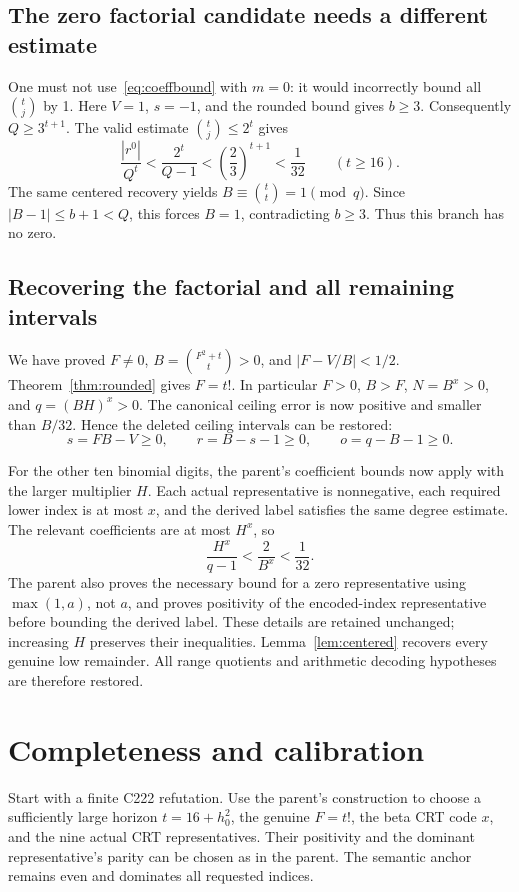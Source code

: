 \documentclass[11pt,letterpaper]{article}
\theoremstyle{remark}\newtheorem{remark}[theorem]{Remark}
\begin{document}
\subsection{The zero factorial candidate needs a different estimate}

One must not use~\eqref{eq:coeffbound} with \(m=0\): it would incorrectly
bound all \(\binom tj\) by 1. Here \(V=1\), \(s=-1\), and the rounded
bound gives \(b\ge3\). Consequently \(Q\ge3^{t+1}\). The valid estimate
\(\binom tj\le2^t\) gives
\[
 \frac{|r^0|}{Q^t}<\frac{2^t}{Q-1}
 <\left(\frac23\right)^{t+1}<\frac1{32}
 \qquad(t\ge16).
\]
The same centered recovery yields \(B\equiv\binom tt=1\pmod q\).
Since \(|B-1|\le b+1<Q\), this forces \(B=1\), contradicting \(b\ge3\).
Thus this branch has no zero.

\subsection{Recovering the factorial and all remaining intervals}

We have proved \(F\ne0\), \(B=\binom{F^2+t}{t}>0\), and
\(|F-V/B|<1/2\). Theorem~\ref{thm:rounded} gives \(F=t!\). In particular
\(F>0\), \(B>F\), \(N=B^x>0\), and \(q=(BH)^x>0\).
The canonical ceiling error is now positive and smaller than \(B/32\).
Hence the deleted ceiling intervals can be restored:
\[
 s=FB-V\ge0,\qquad r=B-s-1\ge0,
 \qquad o=q-B-1\ge0.
\]

For the other ten binomial digits, the parent's coefficient bounds now
apply with the larger multiplier \(H\). Each actual representative is
nonnegative, each required lower index is at most \(x\), and the derived
label satisfies the same degree estimate. The relevant coefficients are
at most \(H^x\), so
\[
 \frac{H^x}{q-1}<\frac2{B^x}<\frac1{32}.
\]
The parent also proves the necessary bound for a zero representative using
\(\max(1,a)\), not \(a\), and proves positivity of the encoded-index
representative before bounding the derived label. These details are
retained unchanged; increasing \(H\) preserves their inequalities.
Lemma~\ref{lem:centered} recovers every genuine low remainder. All range
quotients and arithmetic decoding hypotheses are therefore restored.

\section{Completeness and calibration}\label{sec:complete}

Start with a finite C222 refutation. Use the parent's construction to choose
a sufficiently large horizon \(t=16+h_0^2\), the genuine \(F=t!\), the beta
CRT code \(x\), and the nine actual CRT representatives. Their positivity
and the dominant representative's parity can be chosen as in the parent.
The semantic anchor remains even and dominates all requested indices.
\end{document}
